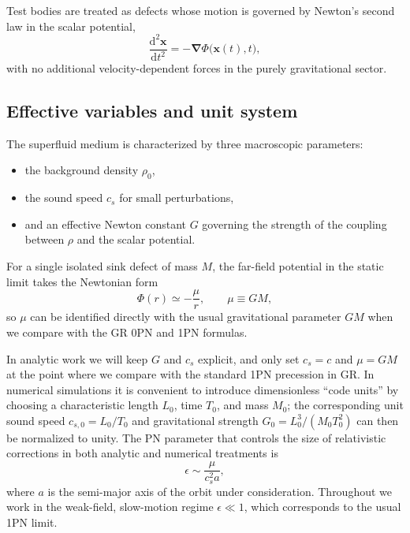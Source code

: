 \documentclass[11pt]{article}
\newcommand{\cS}{c_s}
\newcommand{\dd}{\mathrm{d}}
\begin{document}
Test bodies are treated as defects whose motion is governed by Newton's second law in the scalar potential,
\begin{equation}
  \frac{\dd^2 \mathbf{x}}{\dd t^2} = -\bm{\nabla} \Phi\bigl(\mathbf{x}(t),t\bigr),
\end{equation}
with no additional velocity-dependent forces in the purely gravitational sector.

\subsection{Effective variables and unit system}

The superfluid medium is characterized by three macroscopic parameters:

\begin{itemize}
  \item the background density $\rho_0$,
  \item the sound speed $\cS$ for small perturbations,
  \item and an effective Newton constant $G$ governing the strength of the coupling between $\rho$ and the scalar potential.
\end{itemize}

For a single isolated sink defect of mass $M$, the far-field potential in the static limit takes the Newtonian form
\begin{equation}
  \Phi(r) \simeq -\frac{\mu}{r}, \qquad \mu \equiv G M,
\end{equation}
so $\mu$ can be identified directly with the usual gravitational parameter $GM$ when we compare with the GR 0PN and 1PN formulas.

In analytic work we will keep $G$ and $\cS$ explicit, and only set $\cS = c$ and $\mu = GM$ at the point where we compare with the standard 1PN precession in GR. In numerical simulations it is convenient to introduce dimensionless ``code units'' by choosing a characteristic length $L_0$, time $T_0$, and mass $M_0$; the corresponding unit sound speed $c_{s,0} = L_0/T_0$ and gravitational strength $G_0 = L_0^3/(M_0 T_0^2)$ can then be normalized to unity. The PN parameter that controls the size of relativistic corrections in both analytic and numerical treatments is
\begin{equation}
  \epsilon \sim \frac{\mu}{\cS^2 a},
\end{equation}
where $a$ is the semi-major axis of the orbit under consideration. Throughout we work in the weak-field, slow-motion regime $\epsilon \ll 1$, which corresponds to the usual 1PN limit.
\end{document}
